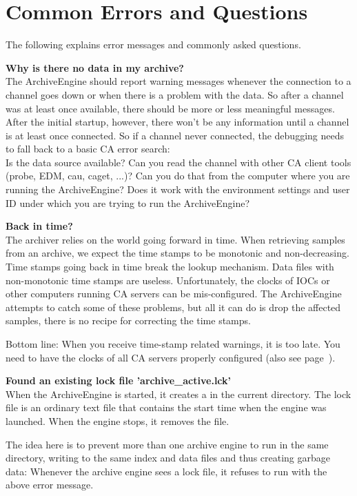 \chapter{Common Errors and Questions}

The following explains error messages and commonly
asked questions.

\noindent
\textbf{Why is there no data in my archive?}\\
The ArchiveEngine should report warning messages whenever the
connection to a channel goes down or when there is a problem with the
data. So after a channel was at least once available, there should be
more or less meaningful messages. After the initial startup, however,
there won't be any information until a channel is at least once
connected. So if a channel never connected, the debugging needs to
fall back to a basic CA error search:\\
Is the data source available?
Can you read the channel with other CA client tools
(probe, EDM, cau, caget, ...)?
Can you do that from the computer where you are running
the ArchiveEngine? Does it work with the environment settings and user
ID under which you are trying to run the ArchiveEngine?

\noindent
\textbf{Back in time?}\\
The archiver relies on the world going forward in time. When
retrieving samples from an archive, we expect the time stamps to be
monotonic and non-decreasing. Time stamps going back in time break the
lookup mechanism. Data files with non-monotonic time stamps are
useless. Unfortunately, the clocks of IOCs or other computers running
CA servers can be mis-configured. The ArchiveEngine attempts to catch
some of these problems, but all it can do is drop the affected
samples, there is no recipe for correcting the time stamps.

Bottom line: When you receive time-stamp related warnings, it is too
late. You need to have the clocks of all CA servers properly configured
(also see page~\pageref{back:in:time}).

\noindent
\textbf{Found an existing lock file 'archive\_active.lck'}\\
When the ArchiveEngine is started, it creates a  in
the current directory. The lock file is an ordinary text file
that contains the start time when the engine was launched. When
the engine stops, it removes the file.

The idea here is to prevent more than one archive engine to run
in the same directory, writing to the same index and data files
and thus creating garbage data: Whenever the archive engine sees
a lock file, it refuses to run with the above error message.

